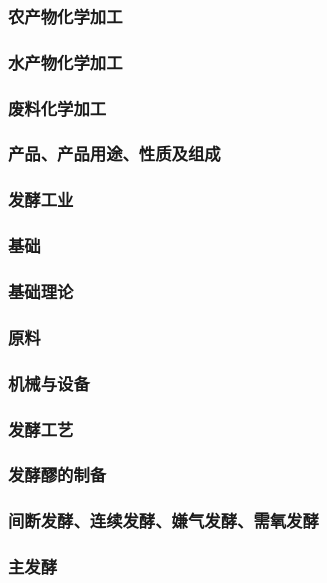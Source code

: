 \documentclass[UTF8]{../../ApplicationUniverse}
\begin{document}
        \subsubsection{农产物化学加工}
        \subsubsection{水产物化学加工}
        \subsubsection{废料化学加工}
    \subsubsection{产品、产品用途、性质及组成}

\subsubsection{发酵工业}
    \subsubsection{基础}
        \subsubsection{基础理论}
        \subsubsection{原料}
        \subsubsection{机械与设备}
        \subsubsection{发酵工艺}
            \subsubsection{发酵醪的制备}
            \subsubsection{间断发酵、连续发酵、嫌气发酵、需氧发酵}
            \subsubsection{主发酵}
\end{document}
